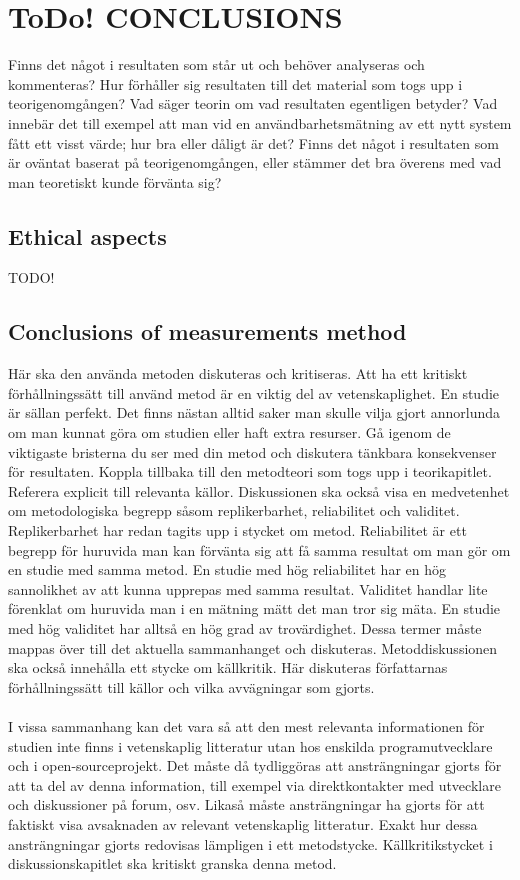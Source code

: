 \chapter{\textbf{ToDo! }CONCLUSIONS}\label{cha:conculsions}
Finns det något i resultaten som står ut och behöver analyseras och kommenteras? Hur
förhåller sig resultaten till det material som togs upp i teorigenomgången? Vad säger teorin
om vad resultaten egentligen betyder? Vad innebär det till exempel att man vid en
användbarhetsmätning av ett nytt system fått ett visst värde; hur bra eller dåligt är det?
Finns det något i resultaten som är oväntat baserat på teorigenomgången, eller stämmer
det bra överens med vad man teoretiskt kunde förvänta sig?


\section{Ethical aspects}\label{sec:ethical}
TODO!

\section{Conclusions of measurements method}
Här ska den använda metoden diskuteras och kritiseras. Att ha ett kritiskt förhållningssätt
till använd metod är en viktig del av vetenskaplighet.
En studie är sällan perfekt. Det finns nästan alltid saker man skulle vilja gjort annorlunda
om man kunnat göra om studien eller haft extra resurser. Gå igenom de viktigaste
bristerna du ser med din metod och diskutera tänkbara konsekvenser för resultaten.
Koppla tillbaka till den metodteori som togs upp i teorikapitlet. Referera explicit till
relevanta källor.
Diskussionen ska också visa en medvetenhet om metodologiska begrepp såsom
replikerbarhet, reliabilitet och validitet. Replikerbarhet har redan tagits upp i stycket om
metod. Reliabilitet är ett begrepp för huruvida man kan förvänta sig att få samma resultat
om man gör om en studie med samma metod. En studie med hög reliabilitet har en hög
sannolikhet av att kunna upprepas med samma resultat. Validitet handlar lite förenklat om
huruvida man i en mätning mätt det man tror sig mäta. En studie med hög validitet har
alltså en hög grad av trovärdighet. Dessa termer måste mappas över till det aktuella
sammanhanget och diskuteras.
Metoddiskussionen ska också innehålla ett stycke om källkritik. Här diskuteras författarnas
förhållningssätt till källor och vilka avvägningar som gjorts.\\
\\
I vissa sammanhang kan det vara så att den mest relevanta informationen för studien inte
finns i vetenskaplig litteratur utan hos enskilda programutvecklare och i open-sourceprojekt.
Det måste då tydliggöras att ansträngningar gjorts för att ta del av denna
information, till exempel via direktkontakter med utvecklare och diskussioner på forum,
osv. Likaså måste ansträngningar ha gjorts för att faktiskt visa avsaknaden av relevant
vetenskaplig litteratur. Exakt hur dessa ansträngningar gjorts redovisas lämpligen i ett
metodstycke. Källkritikstycket i diskussionskapitlet ska kritiskt granska denna metod.
